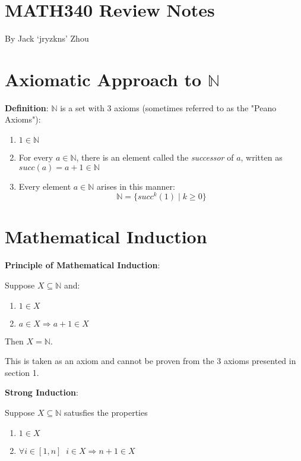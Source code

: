 \documentclass{article}
\begin{document}
\begin{multicols*}{2}

\section*{MATH340 Review Notes}

By Jack `jryzkns' Zhou

\section{Axiomatic Approach to $\mathbb{N}$}

\textbf{Definition}: $\mathbb{N}$ is a set with 3 axioms (sometimes referred to as the "Peano Axioms"):

\begin{enumerate}
    \item $1 \in \mathbb{N}$
    \item For every $a \in \mathbb{N}$, there is an element called the \textit{successor} of $a$, written as $succ(a) = a+1 \in \mathbb{N}$
    \item Every element $a \in \mathbb{N}$ arises in this manner: \[\mathbb{N} = \{succ^{k}(1) \; | \; k \geq 0\}\]
\end{enumerate}

\section{Mathematical Induction}

\textbf{Principle of Mathematical Induction}: 

Suppose $X \subseteq \mathbb{N}$ and:
\begin{enumerate}
    \item $1 \in X$
    \item $a \in X \Rightarrow a+1 \in X$
\end{enumerate}
Then $X = \mathbb{N}$.

This is taken as an axiom and cannot be proven from the 3 axioms presented in section 1.

\textbf{Strong Induction}:

Suppose $X \subseteq \mathbb{N}$ satusfies the properties

\begin{enumerate}
    \item $1 \in X$
    \item $\forall i \in [1,n] \;\; i \in X \Rightarrow n+1 \in X$
    
\end{enumerate}


\end{multicols*}
\end{document}
